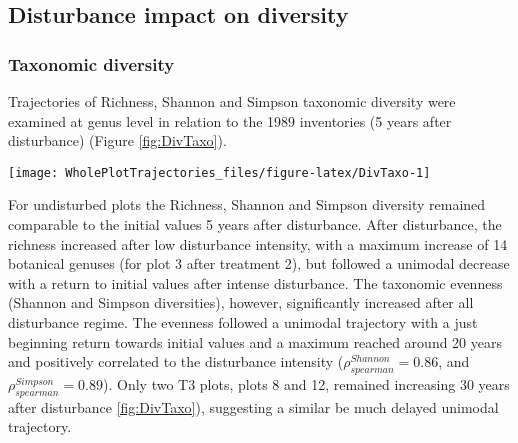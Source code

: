 \documentclass[fleqn,10pt]{ArtEcoFoG} %
\theoremstyle{definition}
\theoremstyle{definition}
\theoremstyle{definition}
\theoremstyle{remark}
\begin{document}
\subsection{Disturbance impact on
diversity}\label{disturbance-impact-on-diversity}

\subsubsection{Taxonomic diversity}\label{taxonomic-diversity}

Trajectories of Richness, Shannon and Simpson taxonomic diversity were
examined at genus level in relation to the 1989 inventories (5 years
after disturbance) (Figure \ref{fig:DivTaxo}).

\begin{figure*}

{\centering \texttt{[image: WholePlotTrajectories\_files/figure-latex/DivTaxo-1]} 

}

\caption{Trajectories of the difference to the 1989 inventories (5 years after disturbance) over 30 years after disturbance of plots communities \textbf{(a)} Richness, \textbf{(b)} Shannon and \textbf{(c)} Simpson diversities. Trajectories correspond to the median (solid line) and 0.025 and 0.975 percentile (gray envelope) observed after 50 iteration of the taxonomic uncertainty propagation. Initial treatments are represented by solid lines colors with green for control, blue for T1,orange for T2 and red for T3.}\label{fig:DivTaxo}
\end{figure*}

For undisturbed plots the Richness, Shannon and Simpson diversity
remained comparable to the initial values 5 years after disturbance.
After disturbance, the richness increased after low disturbance
intensity, with a maximum increase of 14 botanical genuses (for plot 3
after treatment 2), but followed a unimodal decrease with a return to
initial values after intense disturbance. The taxonomic evenness
(Shannon and Simpson diversities), however, significantly increased
after all disturbance regime. The evenness followed a unimodal
trajectory with a just beginning return towards initial values and a
maximum reached around 20 years and positively correlated to the
disturbance intensity (\(\rho_{spearman}^{Shannon}=0.86\), and
\(\rho_{spearman}^{Simpson}=0.89\)). Only two T3 plots, plots 8 and 12,
remained increasing 30 years after disturbance \ref{fig:DivTaxo}),
suggesting a similar be much delayed unimodal trajectory.
\end{document}
